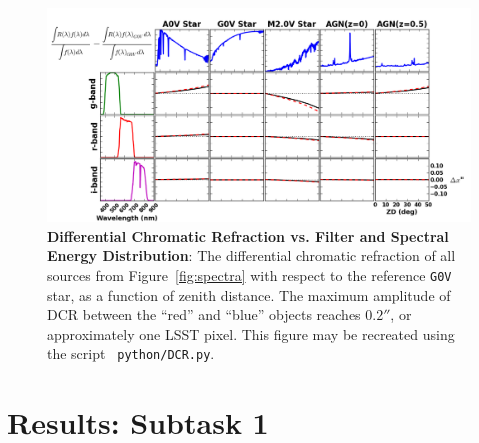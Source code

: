 \documentclass[DM,toc]{lsstdoc}
\begin{document}
\begin{figure}[!t]
  \centering
  \includegraphics[width=1.1\textwidth]{DCR3.png}
  \caption{{\bf Differential Chromatic Refraction vs. Filter and
      Spectral Energy Distribution}: The differential chromatic
    refraction of all sources from Figure~\ref{fig:spectra} with
    respect to the reference {\tt G0V} star, as a function of zenith
    distance.  The maximum amplitude of DCR between the ``red'' and
    ``blue'' objects reaches $0.2''$, or approximately one LSST pixel.
    This figure may be recreated using the script {\tt
      python/DCR.py}.}
  \label{fig:dcr}
\end{figure}



\section{Results: Subtask 1 \label{sec:task1}}

\end{document}
